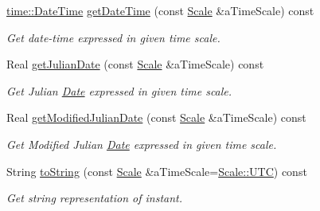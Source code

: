 \begin{DoxyCompactItemize}
\hyperlink{classlibrary_1_1physics_1_1time_1_1_date_time}{time\+::\+Date\+Time} \hyperlink{classlibrary_1_1physics_1_1time_1_1_instant_ae40dbe983c197c961c0cf5aceefa352c}{get\+Date\+Time} (const \hyperlink{namespacelibrary_1_1physics_1_1time_a09d2bc9fbc7b0b5f92e1419bd655e6bb}{Scale} \&a\+Time\+Scale) const
\begin{DoxyCompactList}\small\item\em Get date-\/time expressed in given time scale. \end{DoxyCompactList}\item 
Real \hyperlink{classlibrary_1_1physics_1_1time_1_1_instant_a592844ceab80e29ab65766aedc194acb}{get\+Julian\+Date} (const \hyperlink{namespacelibrary_1_1physics_1_1time_a09d2bc9fbc7b0b5f92e1419bd655e6bb}{Scale} \&a\+Time\+Scale) const
\begin{DoxyCompactList}\small\item\em Get Julian \hyperlink{classlibrary_1_1physics_1_1time_1_1_date}{Date} expressed in given time scale. \end{DoxyCompactList}\item 
Real \hyperlink{classlibrary_1_1physics_1_1time_1_1_instant_a01a167d6aee17d47ff200b2472199382}{get\+Modified\+Julian\+Date} (const \hyperlink{namespacelibrary_1_1physics_1_1time_a09d2bc9fbc7b0b5f92e1419bd655e6bb}{Scale} \&a\+Time\+Scale) const
\begin{DoxyCompactList}\small\item\em Get Modified Julian \hyperlink{classlibrary_1_1physics_1_1time_1_1_date}{Date} expressed in given time scale. \end{DoxyCompactList}\item 
String \hyperlink{classlibrary_1_1physics_1_1time_1_1_instant_aa3e7ee2c6704053afbf7ed142bb40c4e}{to\+String} (const \hyperlink{namespacelibrary_1_1physics_1_1time_a09d2bc9fbc7b0b5f92e1419bd655e6bb}{Scale} \&a\+Time\+Scale=\hyperlink{namespacelibrary_1_1physics_1_1time_a09d2bc9fbc7b0b5f92e1419bd655e6bba9234324ddf6b4176b57d803a925b7961}{Scale\+::\+U\+TC}) const
\begin{DoxyCompactList}\small\item\em Get string representation of instant. \end{DoxyCompactList}\end{DoxyCompactItemize}
